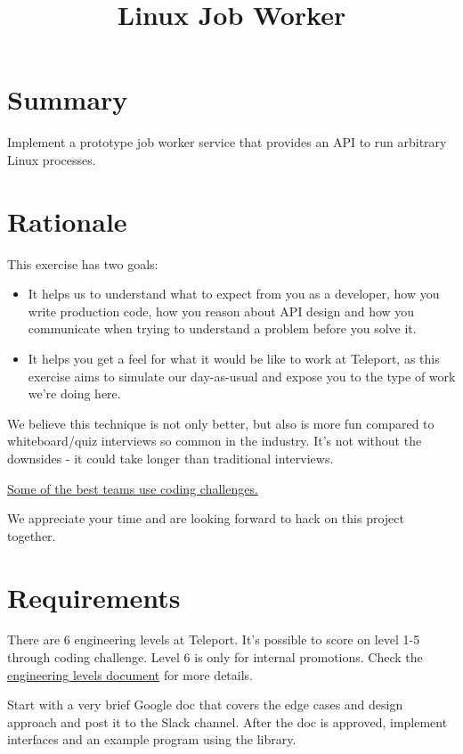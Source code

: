 \documentclass{article}
\begin{document}
\title{Linux Job Worker}

\section{Summary}

Implement a prototype job worker service that provides an API to run arbitrary Linux processes.

\section{Rationale}

    This exercise has two goals:

    \begin{itemize} %
      \item It helps us to understand what to expect from you as a developer, how you write production code, how you reason about API design and how you communicate when trying to understand a problem before you solve it.
      \item It helps you get a feel for what it would be like to work at Teleport, as this exercise aims to simulate our day-as-usual and expose you to the type of work we're doing here.
    \end{itemize}

    We believe this technique is not only better, but also is more fun compared to whiteboard/quiz interviews so common in the industry.  It's not without the downsides - it could take longer than traditional interviews.

    \par

    \href{https://sockpuppet.org/blog/2015/03/06/the-hiring-post/}{Some of the best teams use coding challenges.}

    We appreciate your time and are looking forward to hack on this project together.

\section{Requirements}

  There are 6 engineering levels at Teleport. It's possible to score on level 1-5 through coding challenge.
  Level 6 is only for internal promotions. Check the \href{https://raw.githubusercontent.com/gravitational/careers/main/levels.pdf}{engineering levels document} for more details.

  Start with a very brief Google doc that covers the edge cases and design approach and post it to the Slack channel. After the doc is approved, implement interfaces and an example program using the library.
\end{document}
